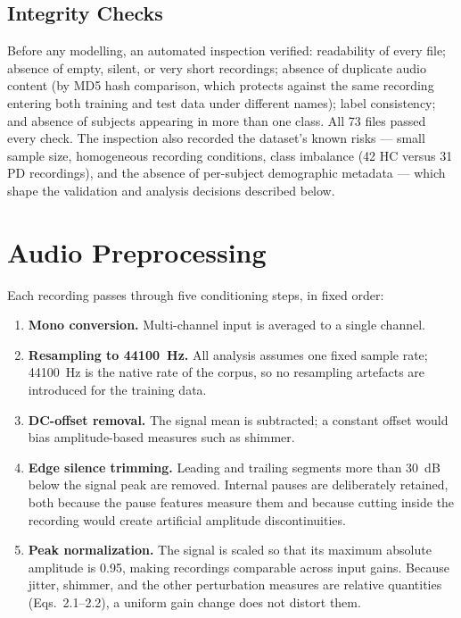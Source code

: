 \subsection{Integrity Checks}

Before any modelling, an automated inspection verified: readability of
every file; absence of empty, silent, or very short recordings;
absence of duplicate audio content (by MD5 hash comparison, which
protects against the same recording entering both training and test
data under different names); label consistency; and absence of
subjects appearing in more than one class. All 73 files passed every
check. The inspection also recorded the dataset's known risks --- small
sample size, homogeneous recording conditions, class imbalance (42 HC
versus 31 PD recordings), and the absence of per-subject demographic
metadata --- which shape the validation and analysis decisions
described below.

\section{Audio Preprocessing}

Each recording passes through five conditioning steps, in fixed order:

\begin{enumerate}
  \item \textbf{Mono conversion.} Multi-channel input is averaged to a
        single channel.
  \item \textbf{Resampling to 44100~Hz.} All analysis assumes one fixed
        sample rate; 44100~Hz is the native rate of the corpus, so no
        resampling artefacts are introduced for the training data.
  \item \textbf{DC-offset removal.} The signal mean is subtracted; a
        constant offset would bias amplitude-based measures such as
        shimmer.
  \item \textbf{Edge silence trimming.} Leading and trailing segments
        more than 30~dB below the signal peak are removed. Internal
        pauses are deliberately retained, both because the pause
        features measure them and because cutting inside the recording
        would create artificial amplitude discontinuities.
  \item \textbf{Peak normalization.} The signal is scaled so that its
        maximum absolute amplitude is 0.95, making recordings
        comparable across input gains. Because jitter, shimmer, and the
        other perturbation measures are relative quantities
        (Eqs.~2.1--2.2), a uniform gain change does not distort them.
\end{enumerate}


